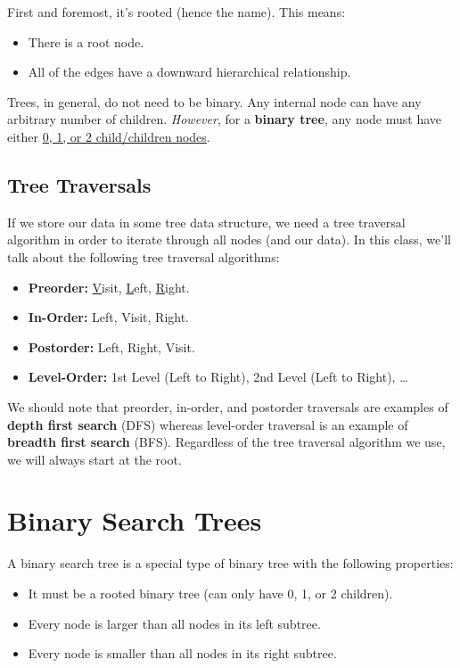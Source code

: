 \documentclass[letterpaper]{article}
\begin{document}
\bigskip 

First and foremost, it's rooted (hence the name). This means: 
\begin{itemize}
    \item There is a root node. 
    \item All of the edges have a downward hierarchical relationship. 
\end{itemize}
Trees, in general, do not need to be binary. Any internal node can have any arbitrary number of children. \emph{However}, for a \textbf{binary tree}, any node must have either \underline{0, 1, or 2 child/children nodes}. 

\subsection{Tree Traversals}
If we store our data in some tree data structure, we need a tree traversal algorithm in order to iterate through all nodes (and our data). In this class, we'll talk about the following tree traversal algorithms: 
\begin{itemize}
    \item \textbf{Preorder:} \underline{V}isit, \underline{L}eft, \underline{R}ight. 
    \item \textbf{In-Order:} Left, Visit, Right. 
    \item \textbf{Postorder:} Left, Right, Visit. 
    \item \textbf{Level-Order:} 1st Level (Left to Right), 2nd Level (Left to Right), \dots
\end{itemize} 
We should note that preorder, in-order, and postorder traversals are examples of \textbf{depth first search} (DFS) whereas level-order traversal is an example of \textbf{breadth first search} (BFS). Regardless of the tree traversal algorithm we use, we will always start at the root. 





\newpage 
\section{Binary Search Trees}
A binary search tree is a special type of binary tree with the following properties: 
\begin{itemize}
    \item It must be a rooted binary tree (can only have 0, 1, or 2 children). 
    \item Every node is larger than all nodes in its left subtree. 
    \item Every node is smaller than all nodes in its right subtree. 
\end{itemize}
\end{document}
